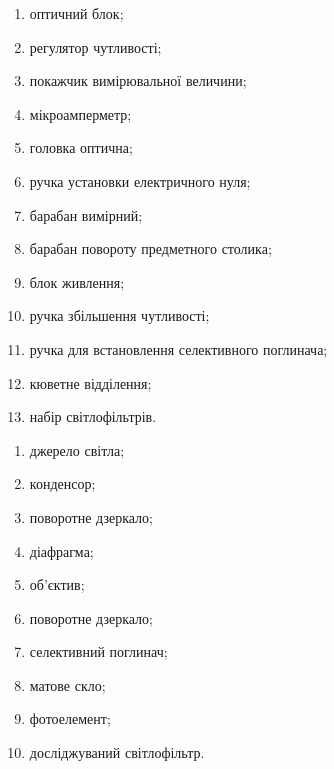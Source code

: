 \documentclass[onecolumn]{el-author}
\begin{document}
\begin{figure}[h]
\caption{\source{}}
\label{img:2}
\end{figure}

\newpage
\begin{enumerate}
	\item оптичний блок;
	\item регулятор чутливості;
	\item покажчик вимірювальної величини;
	\item мікроамперметр;
	\item головка оптична;
	\item ручка установки електричного нуля;
	\item барабан вимірний;
	\item барабан повороту предметного столика;
	\item блок живлення;
	\item ручка збільшення чутливості;
	\item ручка для встановлення селективного поглинача;
	\item кюветне відділення;
	\item набір світлофільтрів.
\end{enumerate}

\bigskip
\bigskip
\bigskip
\bigskip
\bigskip
\bigskip
\bigskip
\bigskip
\bigskip

\begin{enumerate}
	\item джерело світла;
	\item конденсор;
	\item поворотне дзеркало;
	\item діафрагма;
	\item об'єктив;
	\item поворотне дзеркало;
	\item селективний поглинач;
	\item матове скло;
	\item фотоелемент;
	\item досліджуваний світлофільтр.
\end{enumerate}
\clearpage ~
\end{document}
